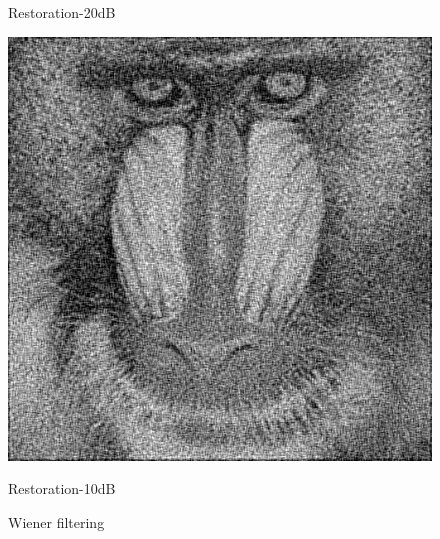 \documentclass{article}
\begin{document}
\begin{figure}[H]
\begin{minipage}[b]{0.32\linewidth}
		\caption*{Restoration-20dB}
	\end{minipage}
	\begin{minipage}[b]{0.32\linewidth}
		\includegraphics[width=\linewidth,bb=0 0 20cm 20cm]{wnr1.bmp}
		\caption*{Restoration-10dB}
	\end{minipage}
	\caption{Wiener filtering}
	\label{wiener}
\end{figure}
\end{document}
